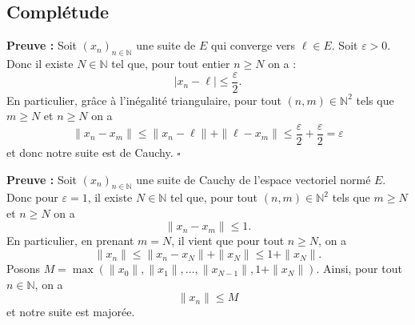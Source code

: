 \documentclass{article}
\begin{document}

\subsection{Complétude}


\noindent\textbf{Preuve :} Soit $(x_n)_{n \in \mathbb{N}}$ une suite de $E$ qui converge vers $\ell \in E$. Soit $\varepsilon > 0$. Donc il existe $N \in \mathbb{N}$ tel que, pour tout entier $n \ge N$ on a :
\[
|x_n - \ell| \le \frac{\varepsilon}{2}.
\]
En particulier, grâce à l'inégalité triangulaire, pour tout $(n, m) \in \mathbb{N}^2$ tels que $m \ge N$ et $n \ge N$ on a
\[
\|x_n - x_m\| \le \|x_n - \ell\| + \|\ell - x_m\| \le \frac{\varepsilon}{2} + \frac{\varepsilon}{2} = \varepsilon
\]
et donc notre suite est de Cauchy. \hfill $\square$


\noindent\textbf{Preuve :} Soit $(x_n)_{n \in \mathbb{N}}$ une suite de Cauchy de l'espace vectoriel normé $E$. Donc pour $\varepsilon = 1$, il existe $N \in \mathbb{N}$ tel que, pour tout $(n, m) \in \mathbb{N}^2$ tels que $m \ge N$ et $n \ge N$ on a
\[
\|x_n - x_m\| \le 1.
\]
En particulier, en prenant $m = N$, il vient que pour tout $n \ge N$, on a
\[
\|x_n\| \le \|x_n - x_N\| + \|x_N\| \le 1 + \|x_N\|.
\]
Posons $M = \max(\|x_0\|, \|x_1\|, \dots, \|x_{N-1}\|, 1 + \|x_N\|)$. Ainsi, pour tout $n \in \mathbb{N}$, on a
\[
\|x_n\| \le M
\]
et notre suite est majorée.


\end{document}

